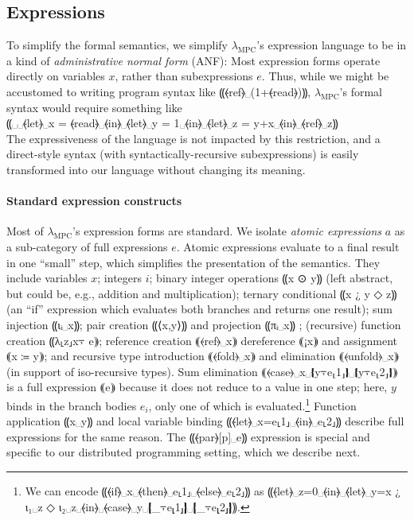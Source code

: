 \documentclass{report}
\newcommand{\mpc}{\ensuremath{\lambda_{\mathrm{MPC}}}\xspace}
\begin{document}
\subsection{Expressions}

To simplify the formal semantics, we simplify \mpc's expression
language to be in a kind of \emph{administrative normal form} (ANF):
Most expression forms operate directly on variables $x$, rather than
subexpressions $e$. Thus, while we might be accustomed to writing
program syntax like ⸨⦑ref⦒␣(1+⦑read⦒)⸩, \mpc's formal syntax
would require something like \\
⸨␣␣⦑let⦒␣x = ⦑read⦒␣⦑in⦒␣⦑let⦒␣y = 1␣⦑in⦒␣⦑let⦒␣z = y+x␣⦑in⦒␣⦑ref⦒␣z⸩ \\
The expressiveness of the language is not impacted by this
restriction, and a direct-style syntax (with syntactically-recursive
subexpressions) is easily transformed into our language without
changing its meaning.

\paragraph{Standard expression constructs}
%
Most of \mpc's expression forms are
standard. We isolate \emph{atomic expressions} $a$ as a sub-category
of full expressions $e$. Atomic expressions evaluate to a final result
in one “small” step, which simplifies the presentation of the semantics.
They include variables $x$; integers $i$; binary integer operations
⸨x ⊙ y⸩ (left abstract, but could be, e.g., addition and multiplication);
ternary conditional ⸨x ¿ y ◇ z⸩ (an “if” expression which evaluates
both branches and returns one result);
%
sum injection ⸨ιᵢ␣x⸩;
%
pair creation ⸨⟨x,y⟩⸩ and projection ⸨πᵢ␣x⸩ ;
%
(recursive) function creation ⸨λ⸤z⸥x⍪ e⸩;
%
reference creation ⸨⦑ref⦒␣x⸩ dereference ⸨¡x⸩ and assignment ⸨x ≔ y⸩;
%
and recursive type introduction ⸨⦑fold⦒␣x⸩ and
elimination ⸨⦑unfold⦒␣x⸩ (in support of iso-recursive types).
%
Sum elimination ⸨⦑case⦒␣x␣❴y⍪e⸤1⸥❵␣❴y⍪e⸤2⸥❵⸩ is a full expression ⸨e⸩
because it does not reduce to a value in one step; here, $y$ binds in
the branch bodies $e_i$, only one of which is
evaluated.\footnote{We can encode ⸨⦑if⦒␣x␣⦑then⦒␣e⸤1⸥␣⦑else⦒␣e⸤2⸥⸩ as
  ⸨⦑let⦒␣z=0␣⦑in⦒␣⦑let⦒␣y=x ¿ ι₁␣z ◇ ι₂␣z␣⦑in⦒␣⦑case⦒␣y␣❴\_⍪e⸤1⸥❵␣❴\_⍪e⸤2⸥❵⸩.}
Function
application ⸨x␣y⸩ and local variable binding ⸨⦑let⦒␣x=e⸤1⸥␣⦑in⦒␣e⸤2⸥⸩
describe full expressions for the same reason. The ⸨⦑par⦒[p]␣e⸩ expression
is special and specific to our distributed programming setting, which
we describe next.
\end{document}
